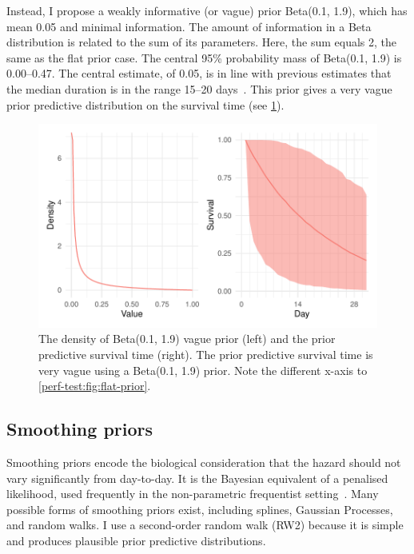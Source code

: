 \documentclass[thesis.tex]{subfiles}
\begin{document}
Instead, I propose a weakly informative (or vague) prior Beta(0.1, 1.9), which has mean 0.05 and minimal information.
The amount of information in a Beta distribution is related to the sum of its parameters.
Here, the sum equals 2, the same as the flat prior case.
The central 95\% probability mass of Beta(0.1, 1.9) is 0.00--0.47.
The central estimate, of 0.05, is in line with previous estimates that the median duration is in the range 15--20 days~\autocite{cevikShedding}.
This prior gives a very vague prior predictive distribution on the survival time (see \cref{perf-test:fig:vague-prior}).
\begin{figure}
  \centering \includegraphics{cis-perfect-testing/vague-prior}
  \caption[Vague prior for the hazard]{The density of Beta(0.1, 1.9) vague prior (left) and the prior predictive survival time (right). The prior predictive survival time is very vague using a Beta(0.1, 1.9) prior. Note the different x-axis to \cref{perf-test:fig:flat-prior}. \label{perf-test:fig:vague-prior}}
\end{figure}


\subsection{Smoothing priors}

Smoothing priors encode the biological consideration that the hazard should not vary significantly from day-to-day.
It is the Bayesian equivalent of a penalised likelihood, used frequently in the non-parametric frequentist setting~\autocite[e.g.:][]{bacchettiNonparametric}.
Many possible forms of smoothing priors exist, including splines, Gaussian Processes, and random walks.
I use a second-order random walk (RW2) because it is simple and produces plausible prior predictive distributions.
\end{document}
